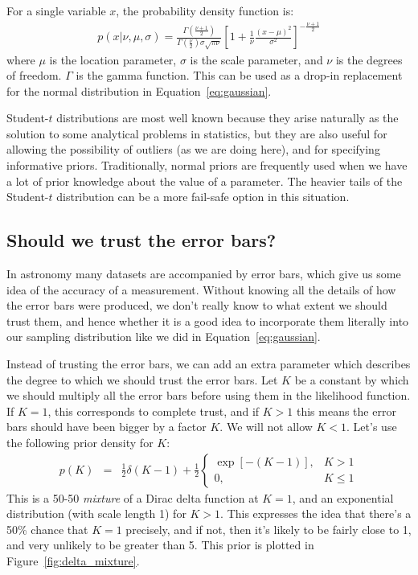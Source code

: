 For a single variable $x$, the probability density function is:
\begin{eqnarray}
p(x|\nu, \mu, \sigma) = \frac{\Gamma\left(\frac{\nu + 1}{2}\right)}
{\Gamma\left(\frac{\nu}{2}\right)\sigma\sqrt{\pi\nu}}
\left[1 + \frac{1}{\nu}\frac{(x - \mu)^2}{\sigma^2}
\right]^{-\frac{\nu + 1}{2}}
\end{eqnarray}
where $\mu$ is the location parameter, $\sigma$ is the scale parameter, and
$\nu$ is the degrees of freedom. $\Gamma$ is the gamma function. This can
be used as a drop-in replacement for the normal distribution in
Equation~\ref{eq:gaussian}.

Student-$t$ distributions are most well known because they arise naturally as
the solution to some analytical problems in statistics, but they are also
useful for allowing the possibility of outliers (as we are doing here), and
for specifying informative priors.
Traditionally, normal priors are frequently used when we
have a lot of prior knowledge about the value of a parameter. The heavier tails
of the Student-$t$ distribution can be a more fail-safe option in this
situation.

\subsection{Should we trust the error bars?}
In astronomy many datasets are accompanied by error bars, which give us some
idea of the accuracy of a measurement. Without knowing all the details of how
the error bars were produced, we don't really know to what extent we should
trust them, and hence whether it is a good idea to
incorporate them literally into our sampling distribution like
we did in Equation~\ref{eq:gaussian}.

Instead of trusting the error bars, we can add an extra parameter which
describes the degree to which we should trust the error bars. Let $K$ be a
constant by which we should multiply all the error bars before using them
in the likelihood function. If $K=1$, this corresponds to complete trust,
and if $K>1$ this means the error bars should have been bigger by a factor $K$.
We will not allow $K < 1$. Let's use the following prior density for $K$:
\begin{eqnarray}
p(K) &=& \frac{1}{2}\delta(K - 1)
+ \frac{1}{2}\left\{
\begin{array}{lr}
\exp\left[-(K-1)\right], & K > 1\\
0, & K \leq 1
\end{array}
\right.
\end{eqnarray}
This is a 50-50 {\it mixture} of a Dirac delta function at $K=1$, and an
exponential distribution (with scale length 1) for $K > 1$. This expresses the
idea that there's a 50\% chance that $K=1$ precisely, and if not, then it's
likely to be fairly close to 1, and very unlikely to be greater than 5.
This prior is plotted in Figure~\ref{fig:delta_mixture}.

